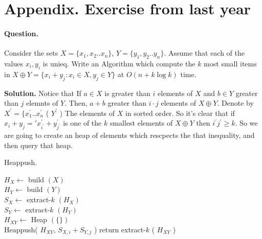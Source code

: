   \newpage
\section{ Appendix. Exercise from last year }

\paragraph{Question.} Consider the sets $X = \{x_1,x_2 .. x_n\}$, $Y = \{y_1, y_2 .. y_n\}$. Assume that each of the values $x_i,y_i$ is unieq. Write an Algorithm which compute the $k$ most small items in $X \oplus Y = \{ x_{i} + y_{j} : x_{i} \in X , y_{j} \in Y  \} $ at $ O \left( n + k\log k  \right) $ time. 

\textbf{Solution.} Notice that If $a \in X$ is greater than $i$ elements of $X$ and $b \in Y$ greater than $j$ elemnts of $Y$. Then, $a + b$  greater than $i\cdot j$ elements of $X \oplus Y$. Denote by $X^\prime = \{ x^{\prime}_{1} .. x^{\prime}_{n}$ ( $Y^{\prime}$ ) The elements of $X$ in sorted order. So it's clear that if $x_{i}+y_{j} = \prime x^{\prime}_{i^{\prime}} + y^{\prime}_{j^{\prime}}$ is one of the $k$ smallest elements of $X\oplus Y$ then $i^{\prime}j^{\prime} \ge k$. So we are going to create an heap of elements which rescpects the that inequality, and then query that heap.

\begin{algbox}{Heappush.}
\begin{algorithm}[H]
{}
$ H_{X} \leftarrow $ build $\left( X \right)$  \\ 
$ H_{Y} \leftarrow $ build $\left( Y \right)$  \\
$ S_{X} \leftarrow $ extract-$k$ $\left( H_{X} \right)$  \\ 
$ S_{Y} \leftarrow $ extract-$k$ $\left( H_{Y} \right)$  \\
$ H_{XY} \leftarrow $ Heap $(\{ \} )$ \\
 {
   {
  	Heappush( $H_{XY}$, $S_{X,i} + S_{Y, j}$ )    
  }
}
return extract-$k$ ( $H_{XY}$ ) 
\end{algorithm}
\end{algbox}





